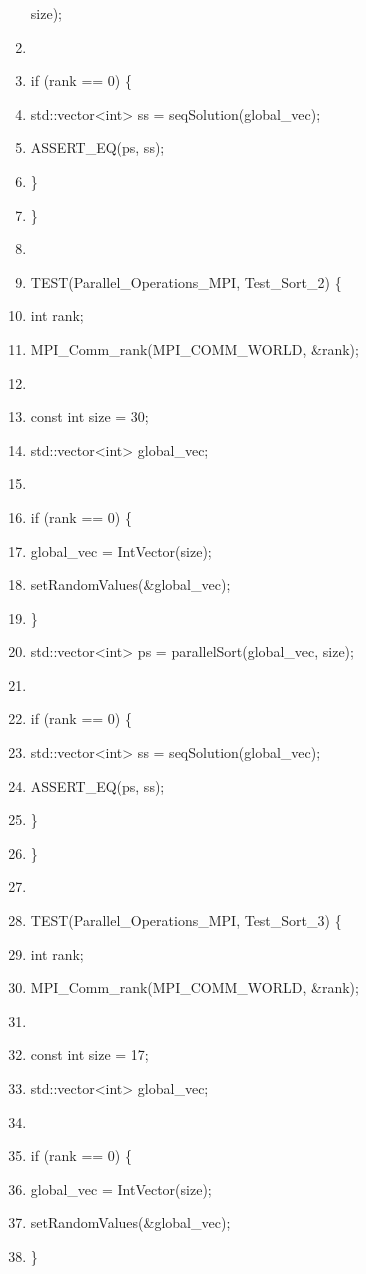 \documentclass[]{article}
\begin{document}
\begin{enumerate}
  size);
\item
\item
  if (rank == 0) \{
\item
  std::vector\textless{}int\textgreater{} ss = seqSolution(global\_vec);
\item
  ASSERT\_EQ(ps, ss);
\item
  \}
\item
  \}
\item
\item
  TEST(Parallel\_Operations\_MPI, Test\_Sort\_2) \{
\item
  int rank;
\item
  MPI\_Comm\_rank(MPI\_COMM\_WORLD, \&rank);
\item
\item
  const int size = 30;
\item
  std::vector\textless{}int\textgreater{} global\_vec;
\item
\item
  if (rank == 0) \{
\item
  global\_vec = IntVector(size);
\item
  setRandomValues(\&global\_vec);
\item
  \}
\item
  std::vector\textless{}int\textgreater{} ps = parallelSort(global\_vec,
  size);
\item
\item
  if (rank == 0) \{
\item
  std::vector\textless{}int\textgreater{} ss = seqSolution(global\_vec);
\item
  ASSERT\_EQ(ps, ss);
\item
  \}
\item
  \}
\item
\item
  TEST(Parallel\_Operations\_MPI, Test\_Sort\_3) \{
\item
  int rank;
\item
  MPI\_Comm\_rank(MPI\_COMM\_WORLD, \&rank);
\item
\item
  const int size = 17;
\item
  std::vector\textless{}int\textgreater{} global\_vec;
\item
\item
  if (rank == 0) \{
\item
  global\_vec = IntVector(size);
\item
  setRandomValues(\&global\_vec);
\item
  \}

\end{enumerate}
\end{document}
